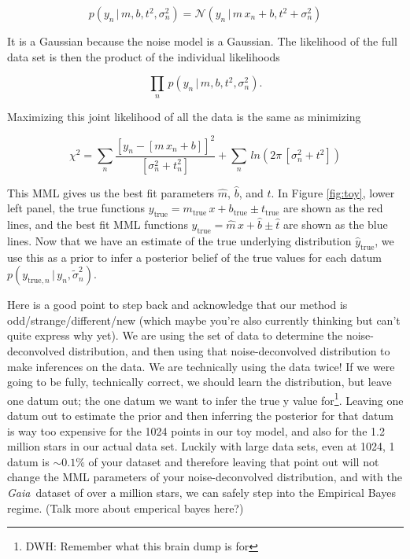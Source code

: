 \documentclass[modern]{aastex61}
\newcommand{\project}[1]{\textsl{#1}}
\newcommand{\gaia}{\project{Gaia}}
\newcommand{\given}{\,|\,}
\newcommand{\true}{\mathrm{true}}
\begin{document}
\begin{equation}
p(y_n \given m, b, t^2, \sigma_n^2) = \mathcal{N}(y_n \given m\,x_n + b, t^2 + \sigma_n^2)
\label{eq:toyLike}
\end{equation}

It is a Gaussian because the noise model is a Gaussian. The likelihood of the full data set is then the product of the individual likelihoods

\begin{equation}
\prod_n\, p(y_n \given m, b, t^2, \sigma_n^2).
\label{eq:toyLikeFull}
\end{equation}

Maximizing this joint likelihood of all the data is the same as minimizing

\begin{equation}
\chi^2 = \sum_n \frac{[y_n - [m\,x_n + b]]^2}{[\sigma_n^2 + t_n^2]} + \sum_n\,ln(2\pi\,[\sigma_n^2 + t^2])
\label{eq:chisq}
\end{equation}

This MML gives us the best fit parameters $\hat{m}$, $\hat{b}$, and $\hat{t}$. In Figure \ref{fig:toy}, lower left panel, the true functions $y_{\true} = m_{\true}\,x + b_{\true} \pm t_{\true}$ are shown as the red lines, and the best fit MML functions $\hat{y}_{\true} = \hat{m}\, x + \hat{b} \pm \hat{t}$ are shown as the blue lines. Now that we have an estimate of the true underlying distribution $\hat{y}_{\true}$, we use this as a prior to infer a posterior belief of the true values for each datum $p(y_{\true,n} \given y_n, \tilde{\sigma}_n^2)$.

Here is a good point to step back and acknowledge that our method is odd/strange/different/new (which maybe you're also currently thinking but can't quite express why yet). We are using the set of data to determine the noise-deconvolved distribution, and then using that noise-deconvolved distribution to make inferences on the data. We are technically using the data twice! If we were going to be fully, technically correct, we should learn the distribution, but leave one datum out; the one datum we want to infer the true y value for\footnote{DWH: Remember what this brain dump is for}. Leaving one datum out to estimate the prior and then inferring the posterior for that datum is way too expensive for the 1024 points in our toy model, and also for the 1.2 million stars in our actual data set. Luckily with large data sets, even at 1024, 1 datum is $\sim0.1\%$ of your dataset and therefore leaving that point out will not change the MML parameters of your noise-deconvolved distribution, and with the \gaia\ dataset of over a million stars, we can safely step into the Empirical Bayes regime. (Talk more about emperical bayes here?)
\end{document}
